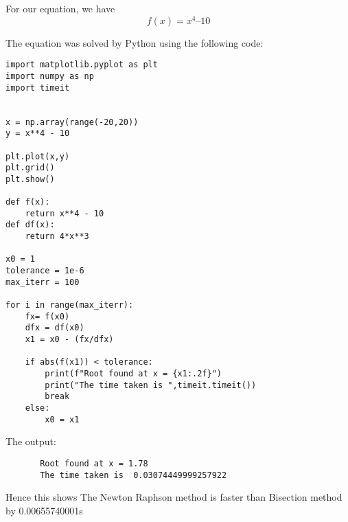 \documentclass{article}
\begin{document}
For our equation, we have $$f(x)= x^4 – 10$$
 
\pagebreak


The equation was solved by Python using the following code:
\begin{verbatim}
import matplotlib.pyplot as plt
import numpy as np
import timeit


x = np.array(range(-20,20))
y = x**4 - 10

plt.plot(x,y)
plt.grid()
plt.show()

def f(x):
    return x**4 - 10
def df(x):
    return 4*x**3

x0 = 1
tolerance = 1e-6
max_iterr = 100

for i in range(max_iterr):
    fx= f(x0)
    dfx = df(x0)
    x1 = x0 - (fx/dfx)

    if abs(f(x1)) < tolerance:
        print(f"Root found at x = {x1:.2f}")
        print("The time taken is ",timeit.timeit())
        break
    else:
        x0 = x1
\end{verbatim}

    The output:
      \begin{verbatim}
       Root found at x = 1.78
       The time taken is  0.03074449999257922
      \end{verbatim}
 
 Hence this shows The Newton Raphson method is faster than Bisection method by 0.00655740001s



       

      
\end{document}
